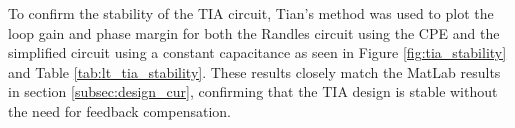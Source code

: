 To confirm the stability of the TIA circuit, Tian's method was used to plot the loop gain and phase margin for both the Randles circuit using the \ac{CPE} and the simplified circuit using a constant capacitance as seen in Figure \ref{fig:tia_stability} and Table \ref{tab:lt_tia_stability}. These results closely match the MatLab results in section \ref{subsec:design_cur}, confirming that the TIA design is stable without the need for feedback compensation.


